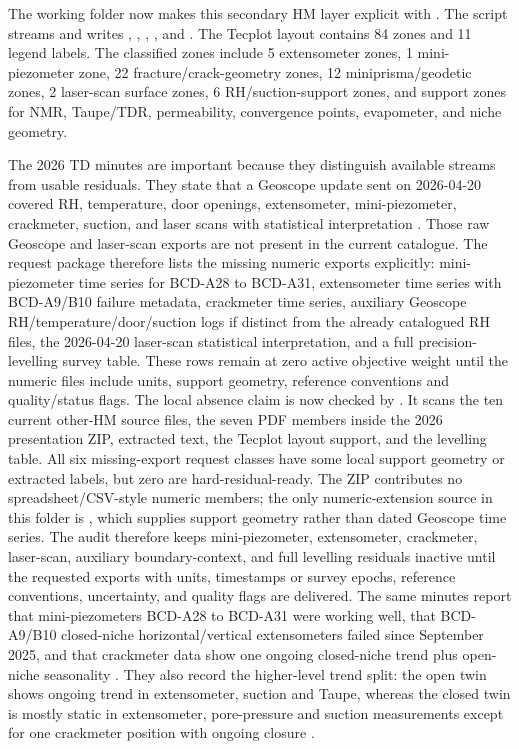 The working folder now makes this secondary HM layer explicit with
.  The script streams
 and writes
, ,
,
, and .  The
Tecplot layout contains 84 zones and 11 legend labels.  The classified zones include
5 extensometer zones, 1 mini-piezometer zone, 22 fracture/crack-geometry zones, 12
miniprisma/geodetic zones, 2 laser-scan surface zones, 6 RH/suction-support zones, and
support zones for NMR, Taupe/TDR, permeability, convergence points, evapometer, and
niche geometry.

The 2026 TD minutes are important because they distinguish available streams from
usable residuals.  They state that a Geoscope update sent on 2026-04-20 covered RH,
temperature, door openings, extensometer, mini-piezometer, crackmeter, suction, and
laser scans with statistical interpretation \cite[PDF p.~3]{TDMinutes2026Local}.
Those raw Geoscope and laser-scan exports are not present in the current catalogue.
The request package
therefore lists the missing numeric exports explicitly: mini-piezometer time series
for BCD-A28 to BCD-A31, extensometer time series with BCD-A9/B10 failure metadata,
crackmeter time series, auxiliary Geoscope RH/temperature/door/suction logs if
distinct from the already catalogued RH files, the 2026-04-20 laser-scan statistical
interpretation, and a full precision-levelling survey table.  These rows remain at
zero active objective weight until the numeric files include units, support geometry,
reference conventions and quality/status flags.
The local absence claim is now checked by
.  It scans the ten current other-HM
source files, the seven PDF members inside the 2026 presentation ZIP, extracted text,
the Tecplot layout support, and the levelling table.  All six missing-export request
classes have some local support geometry or extracted labels, but zero are
hard-residual-ready.  The ZIP contributes no spreadsheet/CSV-style numeric members;
the only numeric-extension source in this folder is ,
which supplies support geometry rather than dated Geoscope time series.  The audit
therefore keeps mini-piezometer, extensometer, crackmeter, laser-scan, auxiliary
boundary-context, and full levelling residuals inactive until the requested exports
with units, timestamps or survey epochs, reference conventions, uncertainty, and
quality flags are delivered.
The same minutes report that mini-piezometers BCD-A28 to BCD-A31 were working well,
that BCD-A9/B10 closed-niche horizontal/vertical extensometers failed since September
2025, and that crackmeter data show one ongoing closed-niche trend plus open-niche
seasonality \cite[PDF p.~3]{TDMinutes2026Local}.  They also record the higher-level
trend split: the open twin shows ongoing trend in extensometer, suction and Taupe,
whereas the closed twin is mostly static in extensometer, pore-pressure and suction
measurements except for one crackmeter position with ongoing closure
\cite[PDF p.~7]{TDMinutes2026Local}.

